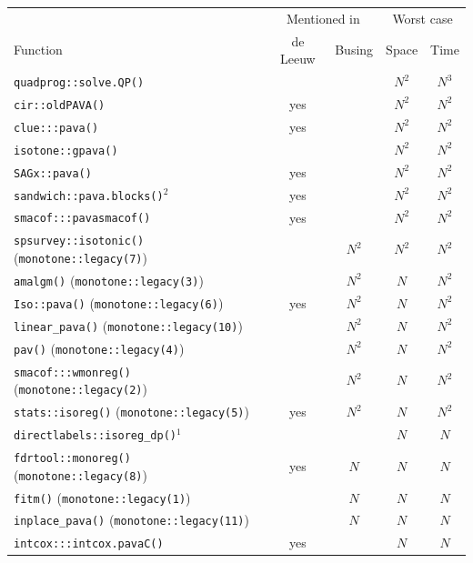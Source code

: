 \documentclass{article}
\begin{document}
\begin{table}[H]
    \centering
    \begin{tabular}{@{}lcccc@{}}
        \toprule
        & \multicolumn{2}{c}{Mentioned in} & \multicolumn{2}{c}{Worst case} \\
        Function & de Leeuw & Busing & Space & Time \\
        \midrule
        \texttt{quadprog::solve.QP()} & & & $N^2$ & $N^3$ \\
        \midrule
        \texttt{cir::oldPAVA()} & yes & & $N^2$ & $N^2$ \\
        \texttt{clue:::pava()} & yes & & $N^2$ & $N^2$ \\
        \texttt{isotone::gpava()} & & & $N^2$ & $N^2$ \\
        \texttt{SAGx::pava()} & yes & & $N^2$ & $N^2$ \\
        \texttt{sandwich::pava.blocks()}$^{2}$ & yes & & $N^2$ & $N^2$ \\
        \texttt{smacof:::pavasmacof()} & yes & & $N^2$ & $N^2$ \\
        \texttt{spsurvey::isotonic()} (\texttt{monotone::legacy(7)}) & & $N^2$ & $N^2$ & $N^2$ \\
        \midrule
        \texttt{amalgm()} (\texttt{monotone::legacy(3)}) & & $N^2$ & $N$ & $N^2$ \\
        \texttt{Iso::pava()} (\texttt{monotone::legacy(6)}) & yes & $N^2$ & $N$ & $N^2$ \\
        \texttt{linear\_pava()} (\texttt{monotone::legacy(10)}) & & $N^2$ & $N$ & $N^2$ \\
        \texttt{pav()} (\texttt{monotone::legacy(4)}) & & $N^2$ & $N$ & $N^2$ \\
        \texttt{smacof:::wmonreg()} (\texttt{monotone::legacy(2)}) & & $N^2$ & $N$ & $N^2$ \\
        \texttt{stats::isoreg()} (\texttt{monotone::legacy(5)}) & yes & $N^2$ & $N$ & $N^2$ \\
        \midrule
        \texttt{directlabels::isoreg\_dp()}$^{1}$ & & & $N$ & $N$ \\
        \texttt{fdrtool::monoreg()} (\texttt{monotone::legacy(8)}) & yes & $N$ & $N$ & $N$ \\
        \texttt{fitm()} (\texttt{monotone::legacy(1)}) & & $N$ & $N$ & $N$ \\
        \texttt{inplace\_pava()} (\texttt{monotone::legacy(11)}) & & $N$ & $N$ & $N$ \\
        \texttt{intcox:::intcox.pavaC()} & yes & & $N$ & $N$ \\

\end{tabular}
\end{table}
\end{document}
